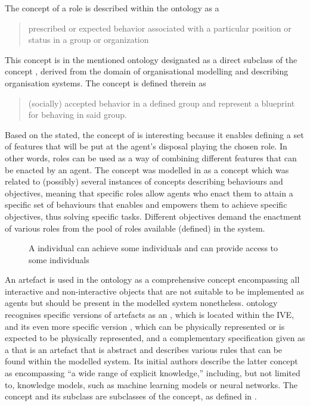  The concept of a role is described within the  ontology as a \blockquote{prescribed or expected behavior associated with a particular position or status in a group or organization}. This concept is in the mentioned ontology designated as a direct subclass of the concept , derived from the domain of organisational modelling and describing organisation systems. The  concept is defined therein as \blockquote{(socially) accepted behavior in a defined group and  represent a blueprint for behaving in said group.} Based on the stated, the concept of  is interesting because it enables defining a set of features that will be put at the agent's disposal playing the chosen role. In other words, roles can be used as a way of combining different features that can be enacted by an agent. The  concept was modelled in \cite{okresaduric2019OrganizationalModelingLargeScale} as a concept which was related to (possibly) several instances of concepts describing behaviours and objectives, meaning that specific roles allow agents who enact them to attain a specific set of behaviours
%
that enables and empowers them to achieve specific objectives, thus solving specific tasks. Different objectives demand the enactment of various roles from the pool of roles available (defined) in the system. 

\begin{figure}
    \centering
    
    \caption{A  individual can achieve some  individuals and can provide access to some  individuals}
    \label{fig: roles achieve objectives and enable knowledge}
\end{figure}

 An artefact is used in the  ontology as a comprehensive concept encompassing all interactive and non-interactive objects that are not suitable to be implemented as agents but should be present in the modelled system nonetheless.  ontology recognises specific versions of artefacts as an , which is located within the \ac{IVE}, and its even more specific version , which can be physically represented or is expected to be physically represented, and a complementary specification given as a  that is an artefact that is abstract and describes various rules that can be found within the modelled system. Its initial authors describe the latter concept as encompassing \enquote{a wide range of explicit knowledge,} including, but not limited to, knowledge models, such as machine learning models or neural networks. The  concept and its subclass  are subclasses of the  concept,
%
as defined in .

